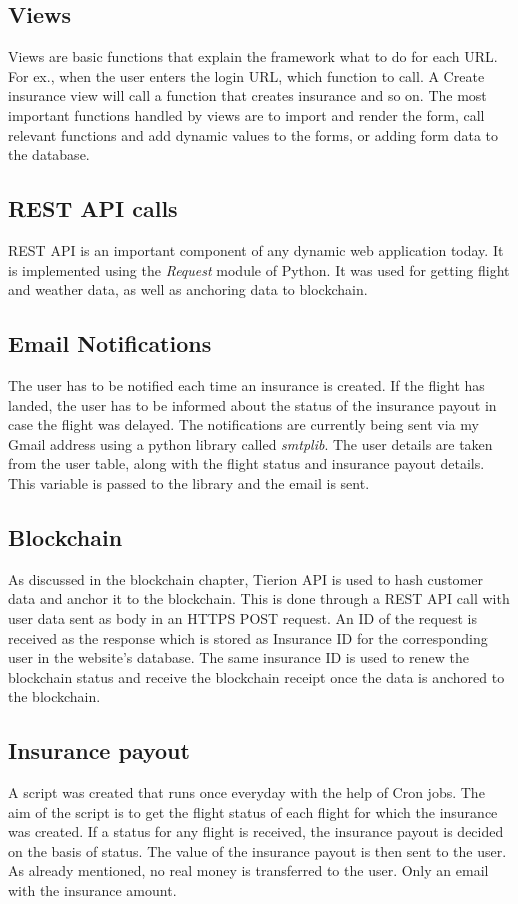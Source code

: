 \subsection{Views}
Views are basic functions that explain the framework what to do for each URL. For ex., when the user enters the login URL, which function to call. A Create insurance view will call a function that creates insurance and so on. The most important functions handled by views are to import and render the form, call relevant functions and add dynamic values to the forms, or adding form data to the database. 

\subsection{REST API calls}
REST API is an important component of any dynamic web application today. It is implemented using the \textit{Request} module of Python. It was used for getting flight and weather data, as well as anchoring data to blockchain. 

\subsection{Email Notifications}
The user has to be notified each time an insurance is created. If the flight has landed, the user has to be informed about the status of the insurance payout in case the flight was delayed. The notifications are currently being sent via my Gmail address using a python library called \textit{smtplib}. The user details are taken from the user table, along with the flight status and insurance payout details. This variable is passed to the library and the email is sent.

\subsection{Blockchain}
As discussed in the blockchain chapter, Tierion API is used to hash customer data and anchor it to the blockchain. This is done through a REST API call with user data sent as body in an HTTPS POST request. An ID of the request is received as the response which is stored as Insurance ID for the corresponding user in the website's database. The same insurance ID is used to renew the blockchain status and receive the blockchain receipt once the data is anchored to the blockchain.

\subsection{Insurance payout}
A script was created that runs once everyday with the help of Cron jobs. The aim of the script is to get the flight status of each flight for which the insurance was created. If a status for any flight is received, the insurance payout is decided on the basis of status. The value of the insurance payout is then sent to the user. As already mentioned, no real money is transferred to the user. Only an email with the insurance amount.

